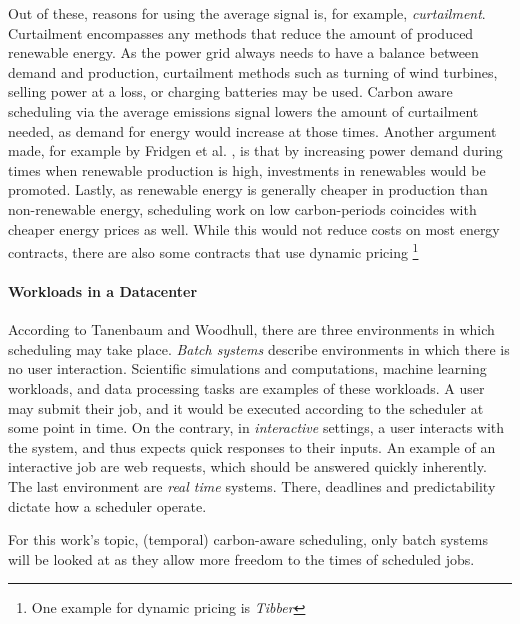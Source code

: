 Out of these, reasons for using the average signal is, for example, \emph{curtailment}. 
Curtailment encompasses any methods that reduce the amount of produced renewable energy. As the power grid always needs to have a balance between demand and production, curtailment methods such as turning of wind turbines, selling power at a loss, or charging batteries may be used. 
Carbon aware scheduling via the average emissions signal lowers the amount of curtailment needed, as demand for energy would increase at those times.
Another argument made, for example by Fridgen et al. \cite{fridgen_not_2021}, is that by increasing power demand during times when renewable production is high, investments in renewables would be promoted. 
Lastly, as renewable energy is generally cheaper in production than non-renewable energy, scheduling work on low carbon-periods coincides with cheaper energy prices as well. While this would not reduce costs on most energy contracts, there are also some contracts that use dynamic pricing \footnote{One example for dynamic pricing is \emph{Tibber}}

\paragraph{Workloads in a Datacenter} According to Tanenbaum and Woodhull\cite{tanenbaum_operating_2006}, there are three environments in which scheduling may take place. \emph{Batch systems} describe environments in which there is no user interaction. 
Scientific simulations and computations, machine learning workloads, and data processing tasks are examples of these workloads\cite{sukprasert_limitations_2024}.
A user may submit their job, and it would be executed according to the scheduler at some point in time. 
On the contrary, in \emph{interactive} settings, a user interacts with the system, and thus expects quick responses to their inputs. An example of an interactive job are web requests, which should be answered quickly inherently.
The last environment are \emph{real time} systems. There, deadlines and predictability dictate how a scheduler operate.

For this work's topic, (temporal) carbon-aware scheduling, only batch systems will be looked at as they allow more freedom to the times of scheduled jobs.

